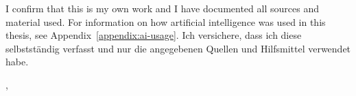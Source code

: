 \cleardoublepage{}

\thispagestyle{empty}
\vspace*{0.8\textheight}
\noindent
\makeatletter
{}
{I confirm that this \MakeLowercase{\getDoctype{}} is my own work and I have documented all sources and material used. For information on how artificial intelligence was used in this thesis, see Appendix~\ref{appendix:ai-usage}.}
{Ich versichere, dass ich diese \getDoctype{} selbstständig verfasst und nur die angegebenen Quellen und Hilfsmittel verwendet habe.}
\makeatother

\vspace{15mm}
\noindent
\getSubmissionLocation{}, \getSubmissionDate{} \hspace{50mm} \getAuthor{}

\cleardoublepage{}

